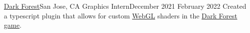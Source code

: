 \resumeSubheading
{\href{https://zkga.me}{Dark Forest}}{San Jose, CA}
{Graphics Intern}{December 2021 \textemdash February 2022}
\resumeItemListStart
{}
{Created a typescript plugin that allows for custom \href{https://developer.mozilla.org/en-US/docs/Web/API/WebGL_API}{WebGL} shaders in the \href{https://zkga.me/}{Dark Forest game}.}
\resumeItemListEnd
